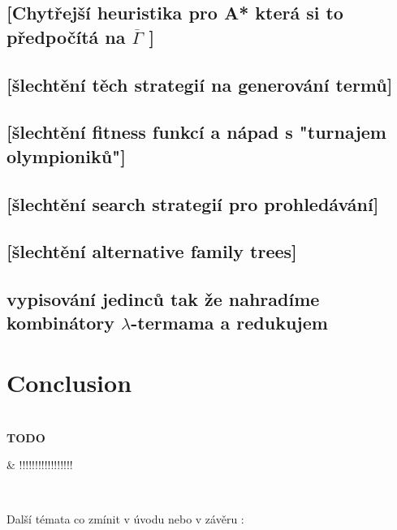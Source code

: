 \documentclass[12pt,a4paper]{report}
\newcommand{\lterm}{$\lambda$-term\xspace}
\newenvironment{todo}
{ ~\\[0.5em]
  {\color{red}\textbf{TODO}}
  \begin{easylist}[itemize]}
{ \end{easylist}
  ~}
\begin{document}
\section{[Chytřejší heuristika pro A* která si to předpočítá na $\overline{\Gamma}$ ]}
\section{[šlechtění těch strategií na generování termů]}
\section{[šlechtění fitness funkcí a nápad s "turnajem olympioniků"]}
\section{[šlechtění search strategií pro prohledávání]}
\section{[šlechtění alternative family trees]}

\section{vypisování jedinců tak že nahradíme kombinátory \lterm{}ama a redukujem }



\chapter*{Conclusion}


\begin{todo}
 & !!!!!!!!!!!!!!!!!
\end{todo}


Další témata co zmínit v úvodu nebo v závěru :\\
\end{document}

